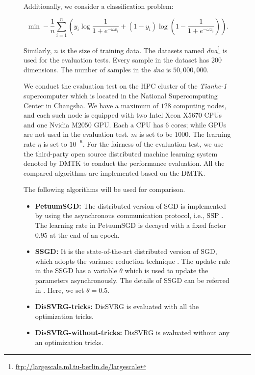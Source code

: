 \documentclass[preprint,review,11pt,a4paper]{elsarticle}
\begin{document}
\begin{figure}
Additionally, we consider a classification problem:

\begin{equation}
\label{classification}
\min -\frac{1}{n}\sum\limits_{i=1}^n\left(y_i\log\frac{1}{1+e^{-\omega x_i}}+(1-y_i)\log(1-\frac{1}{1+e^{-\omega x_i}})\right).
\end{equation}

Similarly, $n$ is the size of training data. The datasets named \emph{dna}\footnote{\url{ftp://largescale.ml.tu-berlin.de/largescale}} is used for the evaluation tests. Every sample in the dataset has $200$ dimensions.  The number of samples in the \emph{dna} is $50,000,000$.

We conduct the evaluation test on the HPC cluster of the \emph{Tianhe-1} supercomputer which is located in the National Supercomputing Center in Changsha. We have a maximum of $128$ computing nodes, and each such node is equipped with two Intel Xeon X5670 CPUs  and  one Nvidia M2050 GPU. Each a CPU has $6$ cores; while GPUs are not used in the evaluation test. $m$  is set to be $1000$. The learning rate $\eta$ is set to $10^{-6}$. For the fairness of the evaluation test, we use the third-party open source distributed machine learning system denoted by DMTK \cite{Yuan:2015ka} to conduct the performance evaluation. All the compared algorithms are implemented based on the DMTK.

The following algorithms will be  used for comparison.
\begin{itemize}
\item \textbf{PetuumSGD:} The distributed version of SGD is implemented by using the asynchronous communication protocol, i.e., SSP \cite{Xing:2015ib}.  The learning rate in PetuumSGD is decayed with a fixed factor $0.95$ at the end of an epoch.
\item \textbf{SSGD:} It is the state-of-the-art distributed version of SGD, which adopts the variance reduction technique \cite{Zhang:2015tp}. The update rule in the SSGD has a variable $\theta$ which is used to update the parameters asynchronously. The details of SSGD can be referred in \cite{Zhang:2015tp}. Here, we set $\theta=0.5$.
\item \textbf{DisSVRG-tricks:} DisSVRG is evaluated with all the optimization tricks.
\item \textbf{DisSVRG-without-tricks:} DisSVRG is evaluated without any an optimization tricks.
\end{itemize}

\end{figure}
\end{document}
